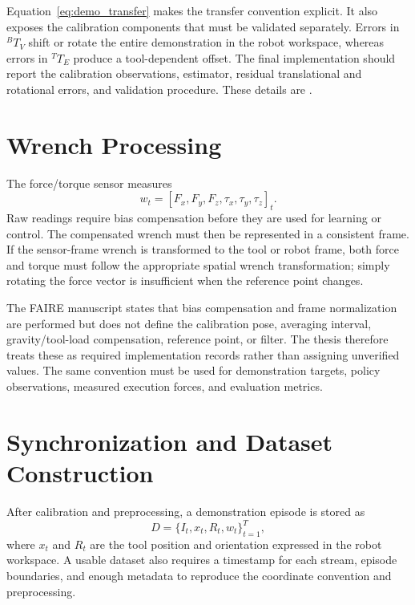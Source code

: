 Equation~\eqref{eq:demo_transfer} makes the transfer convention explicit. It also exposes the calibration components that must be validated separately. Errors in \({}^{B}\!T_V\) shift or rotate the entire demonstration in the robot workspace, whereas errors in \({}^{T}\!T_E\) produce a tool-dependent offset. The final implementation should report the calibration observations, estimator, residual translational and rotational errors, and validation procedure. These details are .

\section{Wrench Processing}
The force/torque sensor measures
\begin{equation}
  w_t=[F_x,F_y,F_z,\tau_x,\tau_y,\tau_z]_t.
\end{equation}
Raw readings require bias compensation before they are used for learning or control. The compensated wrench must then be represented in a consistent frame. If the sensor-frame wrench is transformed to the tool or robot frame, both force and torque must follow the appropriate spatial wrench transformation; simply rotating the force vector is insufficient when the reference point changes.

The FAIRE manuscript states that bias compensation and frame normalization are performed but does not define the calibration pose, averaging interval, gravity/tool-load compensation, reference point, or filter. The thesis therefore treats these as required implementation records rather than assigning unverified values. The same convention must be used for demonstration targets, policy observations, measured execution forces, and evaluation metrics.

\section{Synchronization and Dataset Construction}
After calibration and preprocessing, a demonstration episode is stored as
\begin{equation}
  D=\{I_t,x_t,R_t,w_t\}_{t=1}^{T},
  \label{eq:demonstration_dataset}
\end{equation}
where \(x_t\) and \(R_t\) are the tool position and orientation expressed in the robot workspace. A usable dataset also requires a timestamp for each stream, episode boundaries, and enough metadata to reproduce the coordinate convention and preprocessing.

